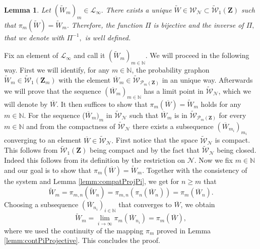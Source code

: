 \documentclass[12pt,twoside,a4paper]{article}
\newtheorem{lemma}[theorem]{Lemma}
\newcommand{\Space}{\mathbf{Z}}
\newcommand{\UGraphon}{\widetilde{\mathcal{W}}_1}
\begin{document}
\begin{lemma}\label{lemm:PiInv1}
Let $(\widetilde{W}_m)_m\in \mathcal{L}_{\infty}.$ There exists a unique $\widetilde{W}\in \mathcal{W}_{\mathcal{N}}\subset\UGraphon(\Space)$ such that $\pi_m(\widetilde{W})=\widetilde{W}_m.$
Therefore, the function  $\Pi$ is bijective and the inverse of $\Pi,$ that we denote with $\Pi^{-1},$ is well defined. 
\end{lemma}
\proof
Fix an element of  $\mathcal{L}_{\infty}$ and call it $(\widetilde{W}_m)_{m \in \mathbb{N}} $. We will proceed in the following way.
First we will identify, for any $m \in \mathbb{N}$, the probability graphon $\widetilde{W}_m\in \UGraphon(\Space_m)$ with the element $\overline{W}_m \in \widetilde{\mathcal{W}}_{\mathcal{P}_m(\Space)}$ in an unique way. Afterwards we will prove that the sequence  
$(\overline{W}_m)_{m \in \mathbb{N}}$ has a limit point in $\mathcal{\widetilde{W}}_{\mathcal{N}}$, which we will denote by $\overline{W}$.  
It then suffices to show that $\pi_m(\overline{W}) =\widetilde{W}_m$ holds for any $m \in \mathbb{N}$.
For the sequence ($\overline{W}_m )_m$ in $\widetilde{\mathcal{W}}_{\mathcal{N}}$ such that  $\overline{W}_m $ is in $\widetilde{\mathcal{W}}_{\mathcal{P}_m(\Space)}$ for every $m\in \mathbb{N}$ and from the compactness of $\widetilde{\mathcal{W}}_{\mathcal{N}}$ there exists a subsequence $(\overline{W}_{m_i} )_{m_i}$ converging to an element $\overline{W} \in \widetilde{\mathcal{W}}_{\mathcal{N}}.$ First notice that the space $\widetilde{\mathcal{W}}_{\mathcal{N}}$ is compact. This follows from $\widetilde{\mathcal{W}}_1(\Space)$ being compact and by the fact that $\widetilde{\mathcal{W}}_{\mathcal{N}}$ being closed. Indeed this follows from its definition by the restriction on $\mathcal{N}$. Now we fix $m\in \mathbb{N}$ and our goal is to show that $\pi_m(\overline{W}) =\widetilde{W}_m.$ Together with the consistency of the system and Lemma \ref{lemm:compatProjPi}, we get for $n \geq m$ that
\[
\widetilde{W}_m = \pi_{m,n}(\widetilde{W}_n) = \pi_{m,n}(\pi_n(\overline{W}_n)) = \pi_m(\overline{W}_n).
\]
Choosing a subsequence $(\overline{W}_{n_i})_{i \in \mathbb{N}}$ that converges to $\overline{W}$, we obtain
\[
\widetilde{W}_m = \lim_{i \to \infty} \pi_m(\overline{W}_{n_i}) = \pi_m(\overline{W}),
\]
where we used the continuity of the mapping $\pi_m$ proved in Lemma \ref{lemm:contPiProjective}. This concludes the proof.
\endproof
\end{document}

